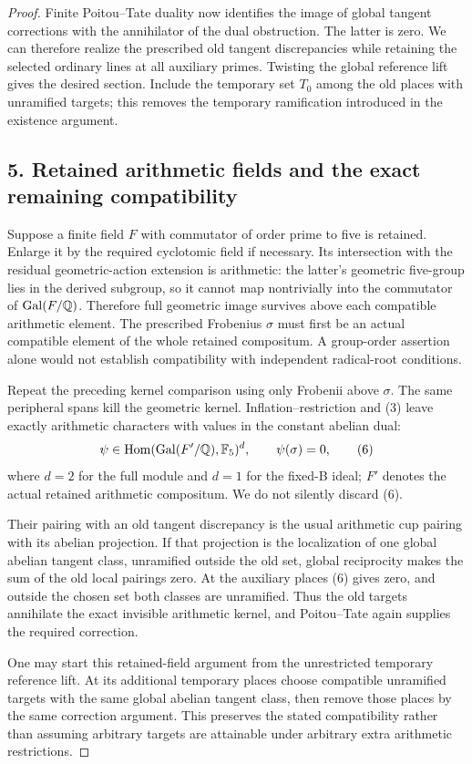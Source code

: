 \documentclass[11pt]{article}
\begin{document}
\begin{proof}
Finite Poitou--Tate duality now identifies the image of global tangent corrections with the annihilator of the dual obstruction. The latter is zero. We can therefore realize the prescribed old tangent discrepancies while retaining the selected ordinary lines at all auxiliary primes. Twisting the global reference lift gives the desired section. Include the temporary set $T_0$ among the old places with unramified targets; this removes the temporary ramification introduced in the existence argument.

\subsection*{5. Retained arithmetic fields and the exact remaining compatibility}
Suppose a finite field $F$ with commutator of order prime to five is retained. Enlarge it by the required cyclotomic field if necessary. Its intersection with the residual geometric-action extension is arithmetic: the latter's geometric five-group lies in the derived subgroup, so it cannot map nontrivially into the commutator of $\operatorname{Gal}(F/\mathbb Q)$. Therefore full geometric image survives above each compatible arithmetic element. The prescribed Frobenius $\sigma$ must first be an actual compatible element of the whole retained compositum. A group-order assertion alone would not establish compatibility with independent radical-root conditions.

Repeat the preceding kernel comparison using only Frobenii above $\sigma$. The same peripheral spans kill the geometric kernel. Inflation--restriction and (3) leave exactly arithmetic characters with values in the constant abelian dual:
\[
 \psi\in\operatorname{Hom}(\operatorname{Gal}(F'/\mathbb Q),\mathbb F_5)^d,
 \qquad \psi(\sigma)=0,
 \tag{6}
\]
where $d=2$ for the full module and $d=1$ for the fixed-B ideal; $F'$ denotes the actual retained arithmetic compositum. We do not silently discard (6).

Their pairing with an old tangent discrepancy is the usual arithmetic cup pairing with its abelian projection. If that projection is the localization of one global abelian tangent class, unramified outside the old set, global reciprocity makes the sum of the old local pairings zero. At the auxiliary places (6) gives zero, and outside the chosen set both classes are unramified. Thus the old targets annihilate the exact invisible arithmetic kernel, and Poitou--Tate again supplies the required correction.

One may start this retained-field argument from the unrestricted temporary reference lift. At its additional temporary places choose compatible unramified targets with the same global abelian tangent class, then remove those places by the same correction argument. This preserves the stated compatibility rather than assuming arbitrary targets are attainable under arbitrary extra arithmetic restrictions.


\end{proof}
\end{document}
